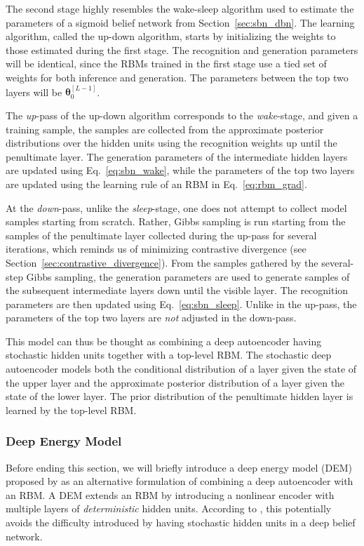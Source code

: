 \documentclass[dissertation,nocontribution]{aaltoseries}
\newcommand{\qlay}[1]{\left[#1\right]}
\newcommand{\vects}[1]{\boldsymbol{#1}}
\newcommand{\TT}[0]{{\vects{\theta}}}
\begin{document}
The second stage highly resembles the wake-sleep algorithm
used to estimate the parameters of a sigmoid belief network
from Section~\ref{sec:sbn_dbn}. The learning algorithm,
called the up-down algorithm, starts by initializing the
weights to those estimated during the first stage. The
recognition and generation parameters will be identical,
since the RBMs trained in the first stage use a tied set of
weights for both inference and generation. The parameters
between the top two layers will be $\TT_0^{\qlay{L-1}}$.

The \textit{up}-pass of the up-down algorithm corresponds to
the \textit{wake}-stage, and given a training sample, the
samples are collected from the approximate posterior
distributions over the hidden units using the recognition
weights up until the penultimate layer. The generation
parameters of the intermediate hidden layers are updated
using Eq.~\eqref{eq:sbn_wake}, while the parameters of the
top two layers are updated using the learning rule of an RBM
in Eq.~\eqref{eq:rbm_grad}.

At the \textit{down}-pass, unlike the \textit{sleep}-stage,
one does not attempt to collect model samples starting from
scratch. Rather, Gibbs sampling is run starting from the
samples of the penultimate layer collected during the
up-pass for several iterations, which reminds us of
minimizing contrastive divergence (see
Section~\ref{sec:contrastive_divergence}). From the samples
gathered by the several-step Gibbs sampling, the generation
parameters are used to generate samples of the subsequent
intermediate layers down until the visible layer. The
recognition parameters are then updated using
Eq.~\eqref{eq:sbn_sleep}. Unlike in the up-pass, the
parameters of the top two layers are \textit{not} adjusted
in the down-pass.

This model can thus be thought as combining a deep
autoencoder having stochastic hidden units together with a
top-level RBM. The stochastic deep autoencoder models both
the conditional distribution of a layer given the state of
the upper layer and the approximate posterior distribution
of a layer given the state of the lower layer. The prior
distribution of the penultimate hidden layer is learned by
the top-level RBM.

\subsubsection{Deep Energy Model}

Before ending this section, we will briefly introduce a deep
energy model (DEM)
proposed by \citet{Ngiam2011} as an alternative formulation
of combining a deep autoencoder with an RBM. A DEM extends
an RBM by introducing a nonlinear encoder with multiple
layers of \textit{deterministic} hidden units. According to
\citet{Ngiam2011}, this potentially avoids the difficulty
introduced by having stochastic hidden units in a deep
belief network.
\end{document}
